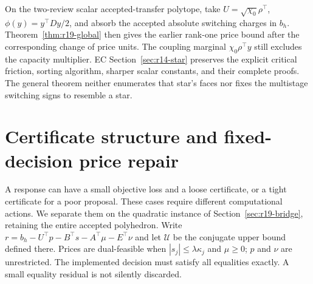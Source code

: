 \documentclass[11pt,letterpaper]{article}
\theoremstyle{definition}
\newcommand{\1}{\mathbf 1}
\begin{document}
On the two-review scalar accepted-transfer polytope, take $U=\sqrt{\chi_0}\rho^\top$, $\phi(y)=y^\top Dy/2$, and absorb the accepted absolute switching charges in $b_h$. Theorem~\ref{thm:r19-global} then gives the earlier rank-one price bound after the corresponding change of price units. The coupling marginal $\chi_0\rho^\top y$ still excludes the capacity multiplier. EC Section~\ref{sec:r14-star} preserves the explicit critical friction, sorting algorithm, sharper scalar constants, and their complete proofs. The general theorem neither enumerates that star's faces nor fixes the multistage switching signs to resemble a star.



\section{Certificate structure and fixed-decision price repair}\label{sec:r22-certification}
A response can have a small objective loss and a loose certificate, or a tight certificate for a poor proposal. These cases require different computational actions. We separate them on the quadratic instance of Section~\ref{sec:r19-bridge}, retaining the entire accepted polyhedron. Write
$r=b_h-U^\top p-B^\top s-A^\top\mu-E^\top\nu$ and let $\mathcal U$ be the conjugate upper bound defined there. Prices are dual-feasible when $|s_j|\leq\lambda\kappa_j$ and $\mu\geq0$; $p$ and $\nu$ are unrestricted. The implemented decision must satisfy all equalities exactly. A small equality residual is not silently discarded.
\end{document}
